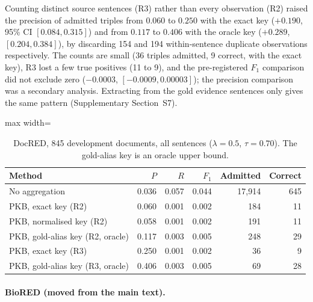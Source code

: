 \documentclass[11pt]{article}
\begin{document}
Counting distinct source sentences (R3) rather than every observation
(R2) raised the precision of admitted triples from $0.060$ to $0.250$
with the exact key ($+0.190$, 95\% CI $[0.084, 0.315]$) and from $0.117$
to $0.406$ with the oracle key ($+0.289$, $[0.204, 0.384]$), by
discarding 154 and 194 within-sentence duplicate observations
respectively. The counts are small (36 triples admitted, 9 correct, with
the exact key), R3 lost a few true positives (11 to 9), and the
pre-registered $F_1$ comparison did not exclude zero ($-0.0003$,
$[-0.0009, 0.00003]$); the precision comparison was a secondary
analysis. Extracting from the gold evidence sentences only gives the
same pattern (Supplementary Section~S7).

\begin{table}[htbp]
\centering
\caption{DocRED, 845 development documents, all sentences
($\lambda=0.5$, $\tau=0.70$). The gold-alias key is an oracle upper
bound.}
\label{tab:docred-results}
\begin{adjustbox}{max width=\textwidth}
\begin{tabular}{@{}lrrrrr@{}}
\toprule
Method & $P$ & $R$ & $F_1$ & Admitted & Correct \\
\midrule
No aggregation & 0.036 & 0.057 & 0.044 & 17,914 & 645 \\
PKB, exact key (R2) & 0.060 & 0.001 & 0.002 & 184 & 11 \\
PKB, normalised key (R2) & 0.058 & 0.001 & 0.002 & 191 & 11 \\
PKB, gold-alias key (R2, oracle) & 0.117 & 0.003 & 0.005 & 248 & 29 \\
PKB, exact key (R3) & 0.250 & 0.001 & 0.002 & 36 & 9 \\
PKB, gold-alias key (R3, oracle) & 0.406 & 0.003 & 0.005 & 69 & 28 \\
\bottomrule
\end{tabular}
\end{adjustbox}
\end{table}

\paragraph{BioRED (moved from the main text).}
\end{document}
